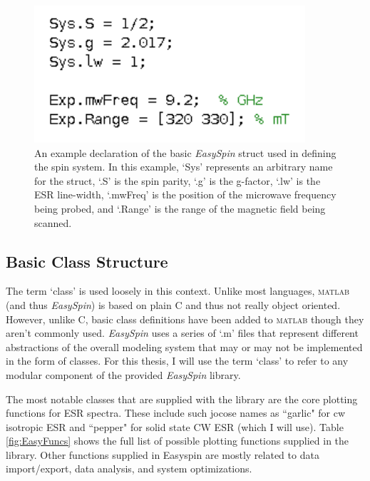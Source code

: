 \documentclass[oneside, noacknowlegments]{BYUPhys}
\begin{document}
\begin{figure}
    \centerline{\includegraphics{example_params_fig}}
    \caption[Simple Spin System Definition]{\label{fig:SpinDefinition}
     An example declaration of the basic \textit{EasySpin} struct used in defining the spin system. In this example, `Sys' represents an arbitrary name for the struct, `.S' is the spin parity, `.g' is the g-factor, `.lw' is the ESR line-width, `.mwFreq' is the position of the microwave frequency being probed, and `.Range' is the range of the magnetic field being scanned.}
 \end{figure}

\subsection{Basic Class Structure}

The term `class' is used loosely in this context. Unlike most languages, \textsc{matlab} (and thus \textit{EasySpin}) is based on plain C and thus not really object oriented. However, unlike C, basic class definitions have been added to \textsc{matlab} though they aren't commonly used. \textit{EasySpin} uses a series of `.m' files that represent different abstractions of the overall modeling system that may or may not be implemented in the form of classes. For this thesis, I will use the term `class' to refer to any modular component of the provided \textit{EasySpin} library.

The most notable classes that are supplied with the library are the core plotting functions for ESR spectra. These include such jocose names as ``garlic" for cw isotropic ESR and ``pepper" \cite{RefWorks:doc:589299f4e4b0d4c09201f915} for solid state CW ESR (which I will use). Table \ref{fig:EasyFuncs} shows the full list of possible plotting functions supplied in the library. Other functions supplied in Easyspin are mostly related to data import/export, data analysis, and system optimizations.
\end{document}
